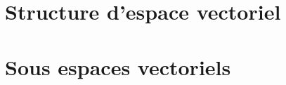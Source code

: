 \section{Structure d'espace vectoriel}\label{sec:structure-d'espace-vectoriel}


\section{Sous espaces vectoriels}\label{sec:sous-espaces-vectoriels}
